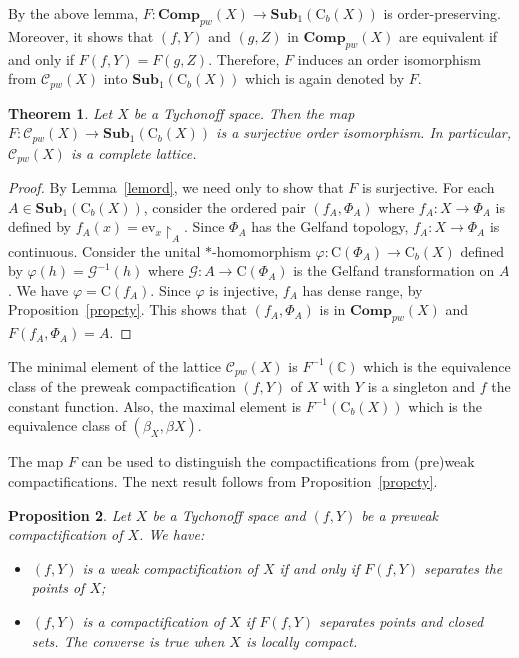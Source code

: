 \documentclass[manuscript]{amsart}
\newtheorem{theorem}{Theorem}[section]
\newtheorem{proposition}[theorem]{Proposition}
\theoremstyle{definition}
\begin{document}
By the above lemma,
$F : \mathbf{Comp}_{pw}(X)\to \mathbf{Sub}_{1}(\mathrm{C}_{b}(X))$
is order-preserving. Moreover, it shows that
$(f,Y)$ and $(g,Z)$ in $\mathbf{Comp}_{pw}(X)$ are equivalent
if and only if $F(f,Y)= F(g,Z)$.
Therefore, $F$ induces an order isomorphism
from $\mathcal{C}_{pw}(X)$ into $\mathbf{Sub}_{1}(\mathrm{C}_{b}(X))$ which
is again denoted by $F$.
\begin{theorem}\label{thrpre}
Let $X$ be a Tychonoff space. Then the map
$F : \mathcal{C}_{pw}(X)\to \mathbf{Sub}_{1}(\mathrm{C}_{b}(X))$ is a surjective order isomorphism. In particular,
 $\mathcal{C}_{pw}(X)$ is a complete lattice.
\end{theorem}
\begin{proof}
By Lemma~\ref{lemord}, we need only to show that $F$ is surjective.
For each $A\in \mathbf{Sub}_{1}(\mathrm{C}_{b}(X))$, consider the ordered pair
$(f_{A}, \Phi_{A})$ where $f_{A}:X\to \Phi_{A}$ is defined by
$f_{A}(x)=\mathrm{ev}_{x}\upharpoonright_{A}$.
Since
$\Phi_{A}$ has the Gelfand topology,
$f_{A}:X\to \Phi_{A}$ is continuous.
Consider the unital $*$-homomorphism
$\varphi : \mathrm{C}(\Phi_{A})\to \mathrm{C}_{b}(X)$ defined by $\varphi(h)=\mathcal{G}^{-1}(h)$ where
$\mathcal{G}:A\to \mathrm{C}(\Phi_{A})$ is the Gelfand transformation on $A$.
We have
$\varphi=\mathrm{C}(f_{A})$. Since
$\varphi$ is injective,  $f_{A}$ has dense range, by Proposition~\ref{propcty}. This
shows that $(f_{A}, \Phi_{A})$ is in $\mathbf{Comp}_{pw}(X)$ and
$F(f_{A}, \Phi_{A})=A$.
\end{proof}

The minimal element of the lattice
 $\mathcal{C}_{pw}(X)$ is $F^{-1}(\mathbb{C})$ which is the equivalence class of
 the preweak compactification $(f, Y)$ of $X$ with $Y$ is a singleton and $f$
  the constant function.
 Also, the maximal element is $F^{-1}(\mathrm{C}_{b}(X))$ which is
 the equivalence class of $(\beta_{X},\beta X)$.

The map $F$
can be used to distinguish the compactifications from (pre)weak compactifications. The next result follows from Proposition~\ref{propcty}.

\begin{proposition}\label{prochar}
Let $X$ be a Tychonoff space and $(f,Y)$
be a preweak compactification of $X$. We have:
\begin{itemize}
\item[(1)]
 $(f,Y)$ is a weak compactification of $X$ if and only if
 $F(f,Y)$ separates the points of $X$;
\item[(2)]
$(f,Y)$ is a  compactification of $X$ if
 $F(f,Y)$ separates  points and closed sets.
 The converse is true when $X$ is locally compact.
\end{itemize}
\end{proposition}
\end{document}
